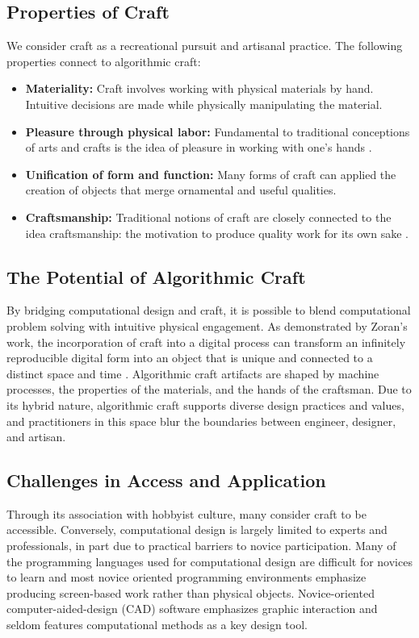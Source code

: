 \documentclass{sigchi}
\begin{document}
\subsection{Properties of Craft}
We consider craft as a recreational pursuit and artisanal practice. The following properties connect to algorithmic craft:
\begin{itemize}
\item \textbf{Materiality:} Craft involves working with physical materials by hand. Intuitive decisions are made while physically manipulating the material. 
\vspace{-6pt}
\item \textbf{Pleasure through physical labor:} Fundamental to traditional conceptions of arts and crafts is the idea of pleasure in working with one's hands \cite{abstracting_craft}.
\vspace{-6pt}
\item \textbf{Unification of form and function:} Many forms of craft can applied the creation of objects that merge ornamental and useful qualities.
\vspace{-6pt}
\item \textbf{Craftsmanship:} Traditional notions of craft are closely connected to the idea craftsmanship: the motivation to produce quality work for its own sake \cite{the_craftsman}.
\end{itemize}

\subsection{The Potential of Algorithmic Craft}
By bridging computational design and craft, it is possible to blend computational problem solving with intuitive physical engagement. As demonstrated by Zoran's work, the incorporation of craft into a digital process can transform an infinitely reproducible digital form into an object that is unique and connected to a distinct space and time \cite{zoran}. Algorithmic craft artifacts are shaped by machine processes, the properties of the materials, and the hands of the craftsman. Due to its hybrid nature, algorithmic craft supports diverse design practices and values, and practitioners in this space blur the boundaries between engineer, designer, and artisan.

\subsection{Challenges in Access and Application}
Through its association with hobbyist culture, many consider craft to be accessible. Conversely, computational design is largely limited to experts and professionals, in part due to practical barriers to novice participation. Many of the programming languages used for computational design are difficult for novices to learn and most novice oriented programming environments emphasize producing screen-based work rather than physical objects. Novice-oriented computer-aided-design (CAD) software emphasizes graphic interaction and seldom features computational methods as a key design tool. 
\end{document}
